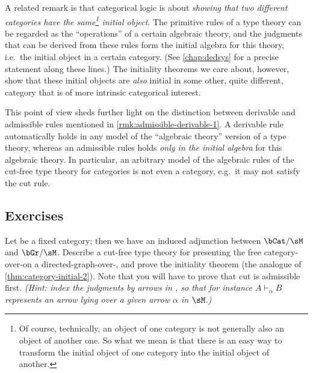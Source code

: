 \documentclass{book}
\let\types\vdash
\begin{document}
\label{sec:identifying-initial-objects}
A related remark is that categorical logic is about \emph{showing that two different categories have the same\footnote{Of course, technically, an object of one category is not generally also an object of another one.  So what we mean is that there is an easy way to transform the initial object of one category into the initial object of another.} initial object}.
The primitive rules of a type theory can be regarded as the ``operations'' of a certain algebraic theory, and the judgments that can be derived from these rules form the initial algebra for this theory, i.e.\ the initial object in a certain category.
(See \cref{chap:dedsys} for a precise statement along these lines.)
The initiality theorems we care about, however, show that these initial objects are \emph{also} initial in some other, quite different, category that is of more intrinsic categorical interest.

\begin{rmk}\label{rmk:admissible-derivable-2}
  This point of view sheds further light on the distinction between derivable and admissible rules mentioned in \cref{rmk:admissible-derivable-1}.
  A derivable rule automatically holds in any model of the ``algebraic theory'' version of a type theory, whereas an admissible rules holds \emph{only in the initial algebra} for this algebraic theory.
  In particular, an arbitrary model of the algebraic rules of the cut-free type theory for categories is not even a category, e.g.\ it may not satisfy the cut rule.
\end{rmk}


\subsection*{Exercises}

\begin{ex}\label{ex:categories-over}
  Let \sM be a fixed category; then we have an induced adjunction between $\bCat/\sM$ and $\bGr/\sM$.
  Describe a cut-free type theory for presenting the free category-over-\sM on a directed-graph-over-\sM, and prove the initiality theorem (the analogue of \cref{thm:category-initial-2}).
  Note that you will have to prove that cut is admissible first.
  \textit{(Hint: index the judgments by arrows in \sM, so that for instance $A\types_\alpha B$ represents an arrow lying over a given arrow $\alpha$ in $\sM$.)}
\end{ex}
\end{document}
